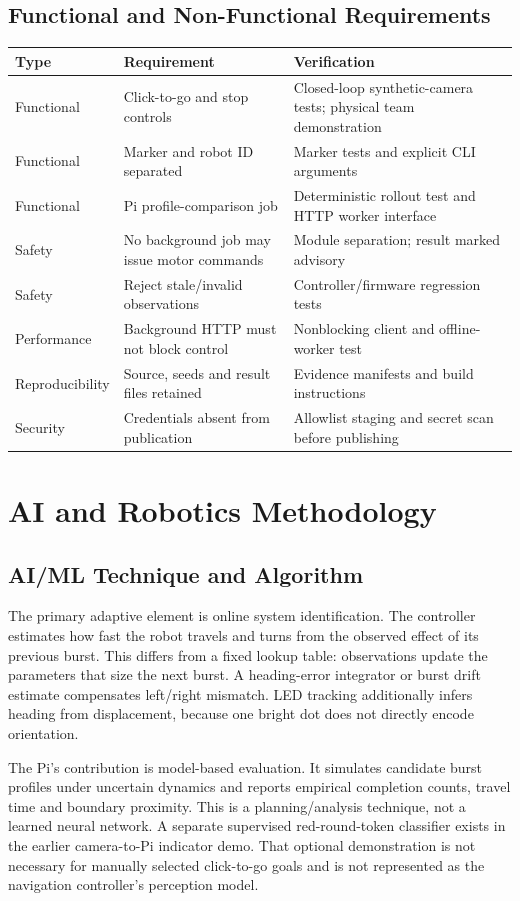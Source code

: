 \documentclass[11pt,a4paper]{article}
\begin{document}
\subsection{Functional and Non-Functional Requirements}
\begin{tabularx}{\textwidth}{@{}lYY@{}}\toprule
Type & Requirement & Verification\\\midrule
Functional & Click-to-go and stop controls & Closed-loop synthetic-camera tests; physical team demonstration\\
Functional & Marker and robot ID separated & Marker tests and explicit CLI arguments\\
Functional & Pi profile-comparison job & Deterministic rollout test and HTTP worker interface\\
Safety & No background job may issue motor commands & Module separation; result marked advisory\\
Safety & Reject stale/invalid observations & Controller/firmware regression tests\\
Performance & Background HTTP must not block control & Nonblocking client and offline-worker test\\
Reproducibility & Source, seeds and result files retained & Evidence manifests and build instructions\\
Security & Credentials absent from publication & Allowlist staging and secret scan before publishing\\\bottomrule
\end{tabularx}

\clearpage\section{AI and Robotics Methodology}
\subsection{AI/ML Technique and Algorithm}
The primary adaptive element is online system identification. The controller
estimates how fast the robot travels and turns from the observed effect of its
previous burst. This differs from a fixed lookup table: observations update the
parameters that size the next burst. A heading-error integrator or burst drift
estimate compensates left/right mismatch. LED tracking additionally infers heading
from displacement, because one bright dot does not directly encode orientation.

The Pi's contribution is model-based evaluation. It simulates candidate burst
profiles under uncertain dynamics and reports empirical completion counts, travel
time and boundary proximity. This is a planning/analysis technique, not a learned
neural network. A separate supervised red-round-token classifier exists in the
earlier camera-to-Pi indicator demo. That optional demonstration is not necessary
for manually selected click-to-go goals and is not represented as the navigation
controller's perception model.
\end{document}
